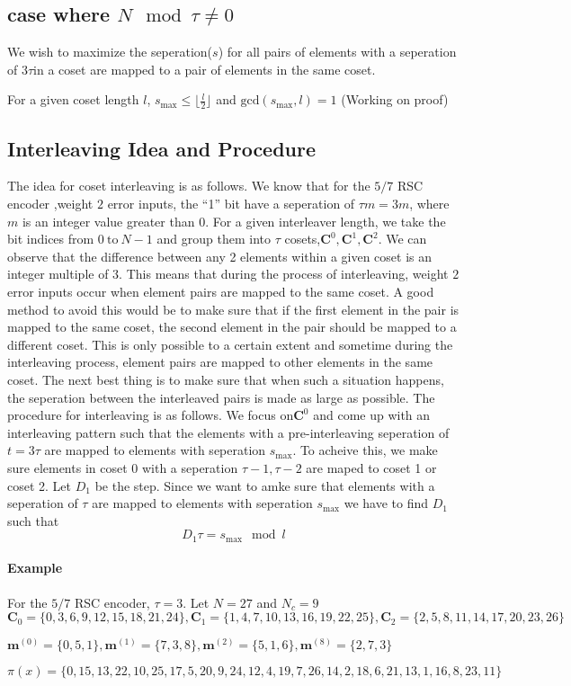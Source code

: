 \documentclass[11pt, oneside, dvipdfmx]{book}
\begin{document}
 \subsection{case where $N \mod \tau \neq 0$}
 
 We wish to maximize the seperation($s$) for all pairs of elements with a seperation of $3\tau $in a coset are mapped to a pair of elements in the same coset. 
 
For a given coset length $l$, $s_{\text{max}}\leq\lfloor\frac{l}{2}\rfloor$ and $\text{gcd}(s_{\text{max}},l)=1$ (Working on proof)
 
 \subsection{Interleaving Idea and Procedure}
 The idea for coset interleaving is as follows. We know that for the $5/7$ RSC encoder ,weight $2$ error inputs, the ``1'' bit have a seperation of $\tau m=3m$, where $m$ is an integer value greater than $0$. For a given interleaver length, we take the bit indices from $0 ~\text{to}~N-1$ and group them into $\tau$ cosets,$\mathbf{C}^0,\mathbf{C}^1,\mathbf{C}^2$. We can observe that the difference between any 2 elements within a given coset is an integer multiple of $3$. This means that during the process of interleaving, weight $2$ error inputs occur when element pairs are mapped to the same coset. A good method to avoid this would be to make sure that if the first element in the pair is mapped to the same coset, the second element in the pair should be mapped to a different coset. This is only possible to a certain extent and sometime during the interleaving process, element pairs are mapped to other elements in the same coset. The next best thing is to make sure that when such a situation happens, the seperation between the interleaved pairs is made as large as possible.
 The procedure for interleaving is as follows. We focus on$\mathbf{C}^0$ and come up with an interleaving pattern such that the  elements with a pre-interleaving seperation of $t=3\tau$ are mapped to elements with seperation $s_{\text{max}}$. To acheive this, we make sure elements in coset 0 with a seperation $\tau-1,\tau-2$ are maped to coset 1 or coset 2.
 Let $D_1$ be the step. Since we want to amke sure that elements with a seperation of $\tau$ are mapped to elements with seperation $s_{\text{max}}$ we have to find $D_1$ such that 
 \begin{equation}
 D_1\tau=s_{\text{max}} \mod l
 \end{equation}
 
 \paragraph{Example}
 For the $5/7$ RSC encoder, $\tau=3$.
 Let $N=27$ and $N_c=9$ $\mathbf{C}_0=\{0,3,6,9,12,15,18,21,24\},\mathbf{C}_1=\{1,4,7,10,13,16,19,22,25\},\mathbf{C}_2=\{2,5,8,11,14,17,20,23,26\}$
 
$\mathbf{m}^{(0)}=\{0,5,1\},\mathbf{m}^{(1)}=\{7,3,8\},\mathbf{m}^{(2)}=\{5,1,6\},\mathbf{m}^{(8)}=\{2,7,3\}$

$\pi(x)=\{0,15,13,22,10,25,17,5,20,9,24,12,4,19,7,26,14,2,18,6,21,13,1,16,8,23,11\}$

 
 
 
 
\end{document}
